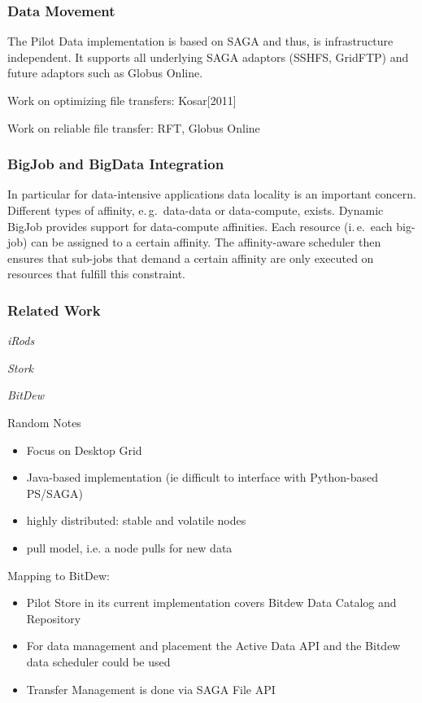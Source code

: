\documentclass[conference,final]{IEEEtran}
\begin{document}
\subsubsection{Data Movement}

The Pilot Data implementation is based on SAGA and thus, is infrastructure
independent. It supports all underlying SAGA adaptors (SSHFS, GridFTP) and
future adaptors such as Globus Online.

Work on optimizing file transfers: Kosar[2011]

Work on reliable file transfer: RFT, Globus Online

\subsubsection{BigJob and BigData Integration}

In particular for data-intensive applications data locality is an important
concern. Different types of affinity, e.\,g.\ data-data or data-compute, exists.
Dynamic BigJob provides support for data-compute affinities. Each resource
(i.\,e.\ each big-job) can be assigned to a certain affinity. The affinity-aware
scheduler then ensures that sub-jobs that demand a certain affinity are only
executed on resources that fulfill this constraint.


\subsubsection{Related Work}

\emph{iRods}


\emph{Stork}


\emph{BitDew}

Random Notes
\begin{itemize}
	\item Focus on Desktop Grid
	\item Java-based implementation (ie difficult to interface with Python-based PS/SAGA)
	\item highly distributed: stable and volatile nodes
	\item pull model, i.e. a node pulls for new data
\end{itemize}


Mapping to BitDew:
\begin{itemize}
	\item Pilot Store in its current implementation covers Bitdew Data Catalog and Repository
	\item For data management and placement the Active Data API and the Bitdew data scheduler could be used
	\item Transfer Management is done via SAGA File API	
\end{itemize}
\end{document}
